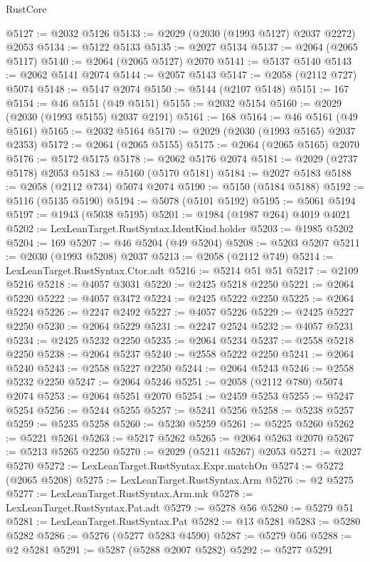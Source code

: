 \begin{lexlean}{RustCore}
\begin{coremodule}
@5127 := @2032 @5126
@5133 := @2029 (@2030 (@1993 @5127) @2037 @2272) @2053
@5134 := @5122 @5133
@5135 := @2027 @5134
@5137 := @2064 (@2065 @5117)
@5140 := @2064 (@2065 @5127) @2070
@5141 := @5137 @5140
@5143 := @2062 @5141 @2074
@5144 := @2057 @5143
@5147 := @2058 (@2112 @727) @5074
@5148 := @5147 @2074
@5150 := @5144 (@2107 @5148)
@5151 := 167
@5154 := @46 @5151 (@49 @5151)
@5155 := @2032 @5154
@5160 := @2029 (@2030 (@1993 @5155) @2037 @2191)
@5161 := 168
@5164 := @46 @5161 (@49 @5161)
@5165 := @2032 @5164
@5170 := @2029 (@2030 (@1993 @5165) @2037 @2353)
@5172 := @2064 (@2065 @5155)
@5175 := @2064 (@2065 @5165) @2070
@5176 := @5172 @5175
@5178 := @2062 @5176 @2074
@5181 := @2029 (@2737 @5178) @2053
@5183 := @5160 (@5170 @5181)
@5184 := @2027 @5183
@5188 := @2058 (@2112 @734) @5074 @2074
@5190 := @5150 (@5184 @5188)
@5192 := @5116 (@5135 @5190)
@5194 := @5078 (@5101 @5192)
@5195 := @5061 @5194
@5197 := @1943 (@5038 @5195)
@5201 := @1984 (@1987 @264) @4019 @4021
@5202 := LexLeanTarget.RustSyntax.IdentKind.holder
@5203 := @1985 @5202
@5204 := 169
@5207 := @46 @5204 (@49 @5204)
@5208 := @5203 @5207
@5211 := @2030 (@1993 @5208) @2037
@5213 := @2058 (@2112 @749)
@5214 := LexLeanTarget.RustSyntax.Ctor.adt
@5216 := @5214 @51 @51
@5217 := @2109 @5216
@5218 := @4057 @3031
@5220 := @2425 @5218 @2250
@5221 := @2064 @5220
@5222 := @4057 @3472
@5224 := @2425 @5222 @2250
@5225 := @2064 @5224
@5226 := @2247 @2492
@5227 := @4057 @5226
@5229 := @2425 @5227 @2250
@5230 := @2064 @5229
@5231 := @2247 @2524
@5232 := @4057 @5231
@5234 := @2425 @5232 @2250
@5235 := @2064 @5234
@5237 := @2558 @5218 @2250
@5238 := @2064 @5237
@5240 := @2558 @5222 @2250
@5241 := @2064 @5240
@5243 := @2558 @5227 @2250
@5244 := @2064 @5243
@5246 := @2558 @5232 @2250
@5247 := @2064 @5246
@5251 := @2058 (@2112 @780) @5074 @2074
@5253 := @2064 @5251 @2070
@5254 := @2459 @5253
@5255 := @5247 @5254
@5256 := @5244 @5255
@5257 := @5241 @5256
@5258 := @5238 @5257
@5259 := @5235 @5258
@5260 := @5230 @5259
@5261 := @5225 @5260
@5262 := @5221 @5261
@5263 := @5217 @5262
@5265 := @2064 @5263 @2070
@5267 := @5213 @5265 @2250
@5270 := @2029 (@5211 @5267) @2053
@5271 := @2027 @5270
@5272 := LexLeanTarget.RustSyntax.Expr.matchOn
@5274 := @5272 (@2065 @5208)
@5275 := LexLeanTarget.RustSyntax.Arm
@5276 := @2 @5275
@5277 := LexLeanTarget.RustSyntax.Arm.mk
@5278 := LexLeanTarget.RustSyntax.Pat.adt
@5279 := @5278 @56
@5280 := @5279 @51
@5281 := LexLeanTarget.RustSyntax.Pat
@5282 := @13 @5281
@5283 := @5280 @5282
@5286 := @5276 (@5277 @5283 @4590)
@5287 := @5279 @56
@5288 := @2 @5281
@5291 := @5287 (@5288 @2007 @5282)
@5292 := @5277 @5291

\end{coremodule}
\end{lexlean}
